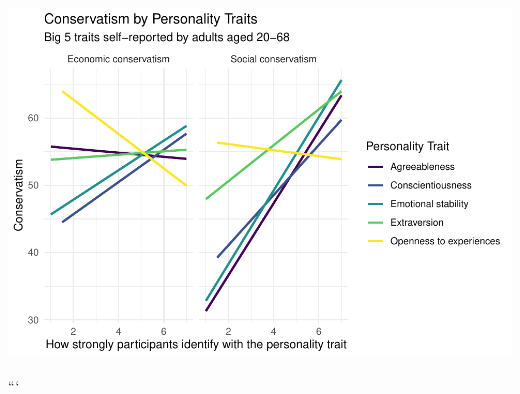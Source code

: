 \documentclass[man]{apa6}
\begin{document}
\includegraphics{manuscript_files/figure-latex/figure1-1.pdf}

```

\endgroup
\end{document}
